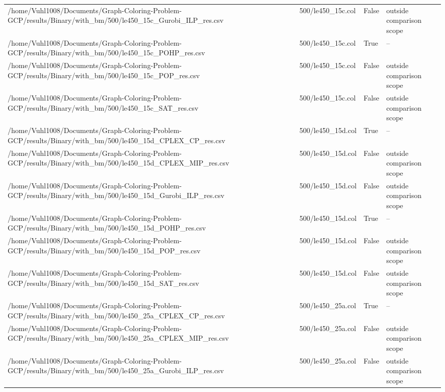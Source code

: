 \begin{table}[htbp]
\begin{tabular}{llll}
/home/Vuhl1008/Documents/Graph-Coloring-Problem-GCP/results/Binary/with\_bm/500/le450\_15c\_Gurobi\_ILP\_res.csv & 500/le450\_15c.col & False & outside comparison scope \\
/home/Vuhl1008/Documents/Graph-Coloring-Problem-GCP/results/Binary/with\_bm/500/le450\_15c\_POHP\_res.csv & 500/le450\_15c.col & True & -- \\
/home/Vuhl1008/Documents/Graph-Coloring-Problem-GCP/results/Binary/with\_bm/500/le450\_15c\_POP\_res.csv & 500/le450\_15c.col & False & outside comparison scope \\
/home/Vuhl1008/Documents/Graph-Coloring-Problem-GCP/results/Binary/with\_bm/500/le450\_15c\_SAT\_res.csv & 500/le450\_15c.col & False & outside comparison scope \\
/home/Vuhl1008/Documents/Graph-Coloring-Problem-GCP/results/Binary/with\_bm/500/le450\_15d\_CPLEX\_CP\_res.csv & 500/le450\_15d.col & True & -- \\
/home/Vuhl1008/Documents/Graph-Coloring-Problem-GCP/results/Binary/with\_bm/500/le450\_15d\_CPLEX\_MIP\_res.csv & 500/le450\_15d.col & False & outside comparison scope \\
/home/Vuhl1008/Documents/Graph-Coloring-Problem-GCP/results/Binary/with\_bm/500/le450\_15d\_Gurobi\_ILP\_res.csv & 500/le450\_15d.col & False & outside comparison scope \\
/home/Vuhl1008/Documents/Graph-Coloring-Problem-GCP/results/Binary/with\_bm/500/le450\_15d\_POHP\_res.csv & 500/le450\_15d.col & True & -- \\
/home/Vuhl1008/Documents/Graph-Coloring-Problem-GCP/results/Binary/with\_bm/500/le450\_15d\_POP\_res.csv & 500/le450\_15d.col & False & outside comparison scope \\
/home/Vuhl1008/Documents/Graph-Coloring-Problem-GCP/results/Binary/with\_bm/500/le450\_15d\_SAT\_res.csv & 500/le450\_15d.col & False & outside comparison scope \\
/home/Vuhl1008/Documents/Graph-Coloring-Problem-GCP/results/Binary/with\_bm/500/le450\_25a\_CPLEX\_CP\_res.csv & 500/le450\_25a.col & True & -- \\
/home/Vuhl1008/Documents/Graph-Coloring-Problem-GCP/results/Binary/with\_bm/500/le450\_25a\_CPLEX\_MIP\_res.csv & 500/le450\_25a.col & False & outside comparison scope \\
/home/Vuhl1008/Documents/Graph-Coloring-Problem-GCP/results/Binary/with\_bm/500/le450\_25a\_Gurobi\_ILP\_res.csv & 500/le450\_25a.col & False & outside comparison scope \\

\end{tabular}
\end{table}
